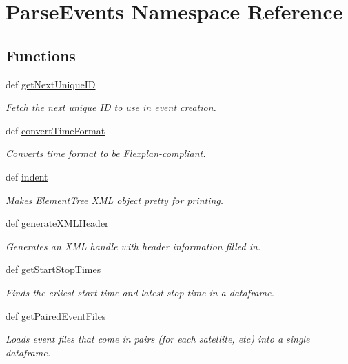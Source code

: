 \hypertarget{namespace_parse_events}{\section{Parse\-Events Namespace Reference}
\label{namespace_parse_events}
}
\subsection*{Functions}
\begin{DoxyCompactItemize}
\item 
def \hyperlink{namespace_parse_events_acf5416340b8836bf73b37db365c2cca9}{get\-Next\-Unique\-I\-D}
\begin{DoxyCompactList}\small\item\em Fetch the next unique I\-D to use in event creation. \end{DoxyCompactList}\item 
def \hyperlink{namespace_parse_events_ac1c84c086b277fca088823a8538c21ba}{convert\-Time\-Format}
\begin{DoxyCompactList}\small\item\em Converts time format to be Flexplan-\/compliant. \end{DoxyCompactList}\item 
def \hyperlink{namespace_parse_events_ab2c3d02a348ce446c259a8d2f566a85a}{indent}
\begin{DoxyCompactList}\small\item\em Makes Element\-Tree X\-M\-L object pretty for printing. \end{DoxyCompactList}\item 
def \hyperlink{namespace_parse_events_a99d337e52231b2739760ef0e22ea1bee}{generate\-X\-M\-L\-Header}
\begin{DoxyCompactList}\small\item\em Generates an X\-M\-L handle with header information filled in. \end{DoxyCompactList}\item 
def \hyperlink{namespace_parse_events_a0b1fed420ddaf2125e2dc9cb87180116}{get\-Start\-Stop\-Times}
\begin{DoxyCompactList}\small\item\em Finds the erliest start time and latest stop time in a dataframe. \end{DoxyCompactList}\item 
def \hyperlink{namespace_parse_events_ac657eb05f8f6dad011f36a1b43ddc5a0}{get\-Paired\-Event\-Files}
\begin{DoxyCompactList}\small\item\em Loads event files that come in pairs (for each satellite, etc) into a single dataframe. \end{DoxyCompactList}\item 

\end{DoxyCompactItemize}
